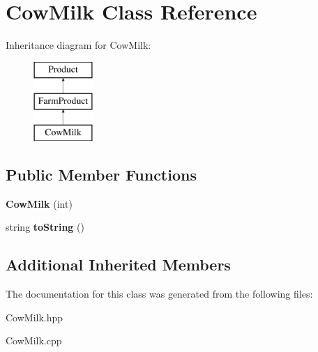 \hypertarget{class_cow_milk}{}\section{Cow\+Milk Class Reference}
\label{class_cow_milk}
Inheritance diagram for Cow\+Milk\+:\begin{figure}[H]
\begin{center}
\leavevmode
\includegraphics[height=3.000000cm]{class_cow_milk}
\end{center}
\end{figure}
\subsection*{Public Member Functions}
\begin{DoxyCompactItemize}
\item 
\mbox{\label{class_cow_milk_a2d6418e29a7a0371f10352fa5e125b38}} 
{\bfseries Cow\+Milk} (int)
\item 
\mbox{\label{class_cow_milk_a21429052b627407e397b71f27069724e}} 
string {\bfseries to\+String} ()
\end{DoxyCompactItemize}
\subsection*{Additional Inherited Members}


The documentation for this class was generated from the following files\+:\begin{DoxyCompactItemize}
\item 
Cow\+Milk.\+hpp\item 
Cow\+Milk.\+cpp\end{DoxyCompactItemize}
